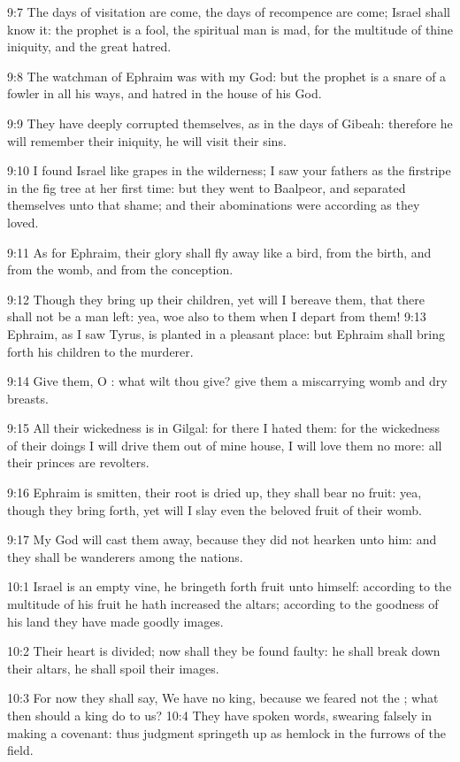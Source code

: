 9:7 The days of visitation are come, the days of recompence are come; Israel shall know it: the prophet is a fool, the spiritual man is mad, for the multitude of thine iniquity, and the great hatred.

9:8 The watchman of Ephraim was with my God: but the prophet is a snare of a fowler in all his ways, and hatred in the house of his God.

9:9 They have deeply corrupted themselves, as in the days of Gibeah: therefore he will remember their iniquity, he will visit their sins.

9:10 I found Israel like grapes in the wilderness; I saw your fathers as the firstripe in the fig tree at her first time: but they went to Baalpeor, and separated themselves unto that shame; and their abominations were according as they loved.

9:11 As for Ephraim, their glory shall fly away like a bird, from the birth, and from the womb, and from the conception.

9:12 Though they bring up their children, yet will I bereave them, that there shall not be a man left: yea, woe also to them when I depart from them!  9:13 Ephraim, as I saw Tyrus, is planted in a pleasant place: but Ephraim shall bring forth his children to the murderer.

9:14 Give them, O \LORD: what wilt thou give? give them a miscarrying womb and dry breasts.

9:15 All their wickedness is in Gilgal: for there I hated them: for the wickedness of their doings I will drive them out of mine house, I will love them no more: all their princes are revolters.

9:16 Ephraim is smitten, their root is dried up, they shall bear no fruit: yea, though they bring forth, yet will I slay even the beloved fruit of their womb.

9:17 My God will cast them away, because they did not hearken unto him: and they shall be wanderers among the nations.

10:1 Israel is an empty vine, he bringeth forth fruit unto himself: according to the multitude of his fruit he hath increased the altars; according to the goodness of his land they have made goodly images.

10:2 Their heart is divided; now shall they be found faulty: he shall break down their altars, he shall spoil their images.

10:3 For now they shall say, We have no king, because we feared not the \LORD; what then should a king do to us?  10:4 They have spoken words, swearing falsely in making a covenant: thus judgment springeth up as hemlock in the furrows of the field.

